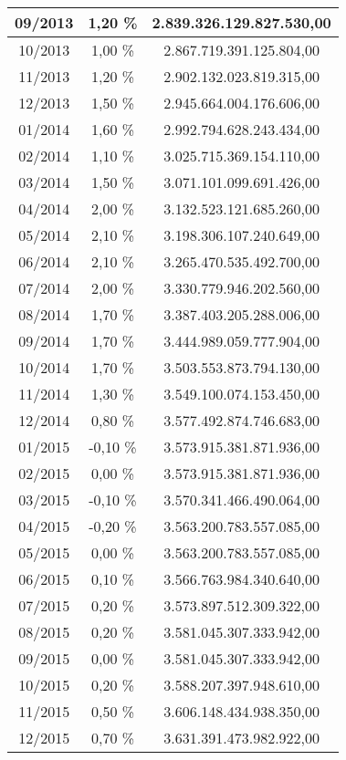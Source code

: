 \begin{center}
\begin{longtable}{|c|c|c|}
09/2013 & 1,20 \% & 2.839.326.129.827.530,00 \\ \hline
10/2013 & 1,00 \% & 2.867.719.391.125.804,00 \\ \hline
11/2013 & 1,20 \% & 2.902.132.023.819.315,00 \\ \hline
12/2013 & 1,50 \% & 2.945.664.004.176.606,00 \\ \hline
01/2014 & 1,60 \% & 2.992.794.628.243.434,00 \\ \hline
02/2014 & 1,10 \% & 3.025.715.369.154.110,00 \\ \hline
03/2014 & 1,50 \% & 3.071.101.099.691.426,00 \\ \hline
04/2014 & 2,00 \% & 3.132.523.121.685.260,00 \\ \hline
05/2014 & 2,10 \% & 3.198.306.107.240.649,00 \\ \hline
06/2014 & 2,10 \% & 3.265.470.535.492.700,00 \\ \hline
07/2014 & 2,00 \% & 3.330.779.946.202.560,00 \\ \hline
08/2014 & 1,70 \% & 3.387.403.205.288.006,00 \\ \hline
09/2014 & 1,70 \% & 3.444.989.059.777.904,00 \\ \hline
10/2014 & 1,70 \% & 3.503.553.873.794.130,00 \\ \hline
11/2014 & 1,30 \% & 3.549.100.074.153.450,00 \\ \hline
12/2014 & 0,80 \% & 3.577.492.874.746.683,00 \\ \hline
01/2015 & -0,10 \% & 3.573.915.381.871.936,00 \\ \hline
02/2015 & 0,00 \% & 3.573.915.381.871.936,00 \\ \hline
03/2015 & -0,10 \% & 3.570.341.466.490.064,00 \\ \hline
04/2015 & -0,20 \% & 3.563.200.783.557.085,00 \\ \hline
05/2015 & 0,00 \% & 3.563.200.783.557.085,00 \\ \hline
06/2015 & 0,10 \% & 3.566.763.984.340.640,00 \\ \hline
07/2015 & 0,20 \% & 3.573.897.512.309.322,00 \\ \hline
08/2015 & 0,20 \% & 3.581.045.307.333.942,00 \\ \hline
09/2015 & 0,00 \% & 3.581.045.307.333.942,00 \\ \hline
10/2015 & 0,20 \% & 3.588.207.397.948.610,00 \\ \hline
11/2015 & 0,50 \% & 3.606.148.434.938.350,00 \\ \hline
12/2015 & 0,70 \% & 3.631.391.473.982.922,00 \\ \hline

\end{longtable}
\end{center}
